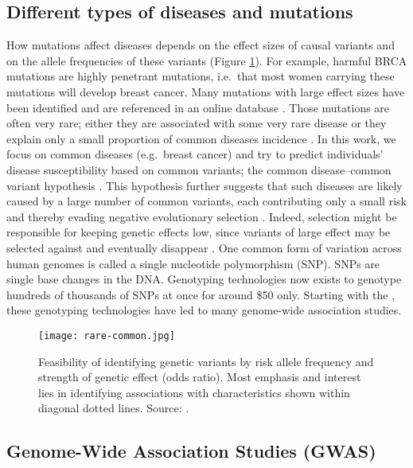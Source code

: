\subsection{Different types of diseases and mutations}

How mutations affect diseases depends on the effect sizes of causal variants and on the allele frequencies of these variants (Figure \ref{fig:rare-common}).
For example, harmful BRCA mutations are highly penetrant mutations, i.e.\ that most women carrying these mutations will develop breast cancer. Many mutations with large effect sizes have been identified and are referenced in an online database \cite[]{hamosh2005online}. 
Those mutations are often very rare; either they are associated with some very rare disease or they explain only a small proportion of common diseases incidence \cite[]{anglian2000prevalence}.
In this work, we focus on common diseases (e.g.\ breast cancer) and try to predict individuals' disease susceptibility based on common variants; the common disease--common variant hypothesis \cite[]{pritchard2002allelic}. This hypothesis further suggests that such diseases are likely caused by a large number of common variants, each contributing only a small risk and thereby evading negative evolutionary selection \cite[]{salari2012personalized}.
Indeed, selection might be responsible for keeping genetic effects low, since variants of large effect may be selected against and eventually disappear \cite[]{pritchard2002allelic}.
One common form of variation across human genomes is called a single nucleotide polymorphism (SNP). SNPs are single base changes in the DNA.
Genotyping technologies now exists to genotype hundreds of thousands of SNPs at once for around \$50 only. Starting with the \cite{wellcome2007genome}, these genotyping technologies have led to many genome-wide association studies.

\begin{figure}[htb]
\centerline{\texttt{[image: rare-common.jpg]}}
\caption{Feasibility of identifying genetic variants by risk allele frequency and strength of genetic effect (odds ratio). Most emphasis and interest lies
in identifying associations with characteristics shown within diagonal dotted
lines. Source: \cite{manolio2009finding}.}
\label{fig:rare-common}
\end{figure}

\subsection{Genome-Wide Association Studies (GWAS)}

